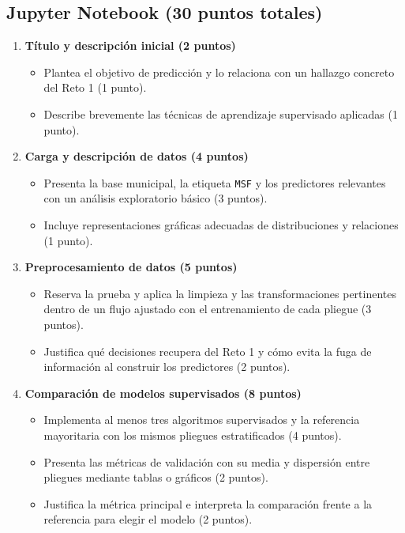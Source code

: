 \documentclass[a4,11pt]{aleph-notas}
\begin{document}
\subsection*{Jupyter Notebook (30 puntos totales)}
\begin{enumerate}[leftmargin=*,label=\textbf{\arabic*.}]
    \item \textbf{Título y descripción inicial (2 puntos)}
    \begin{itemize}[leftmargin=*]
        \item Plantea el objetivo de predicción y lo relaciona con un hallazgo concreto del Reto 1 (1 punto).
        \item Describe brevemente las técnicas de aprendizaje supervisado aplicadas (1 punto).
    \end{itemize}

    \item \textbf{Carga y descripción de datos (4 puntos)}
    \begin{itemize}[leftmargin=*]
        \item Presenta la base municipal, la etiqueta \texttt{MSF} y los predictores relevantes con un análisis exploratorio básico (3 puntos).
        \item Incluye representaciones gráficas adecuadas de distribuciones y relaciones (1 punto).
    \end{itemize}

    \item \textbf{Preprocesamiento de datos (5 puntos)}
    \begin{itemize}[leftmargin=*]
        \item Reserva la prueba y aplica la limpieza y las transformaciones pertinentes dentro de un flujo ajustado con el entrenamiento de cada pliegue (3 puntos).
        \item Justifica qué decisiones recupera del Reto 1 y cómo evita la fuga de información al construir los predictores (2 puntos).
    \end{itemize}

    \item \textbf{Comparación de modelos supervisados (8 puntos)}
    \begin{itemize}[leftmargin=*]
        \item Implementa al menos tres algoritmos supervisados y la referencia mayoritaria con los mismos pliegues estratificados (4 puntos).
        \item Presenta las métricas de validación con su media y dispersión entre pliegues mediante tablas o gráficos (2 puntos).
        \item Justifica la métrica principal e interpreta la comparación frente a la referencia para elegir el modelo (2 puntos).
    \end{itemize}


\end{enumerate}
\end{document}
